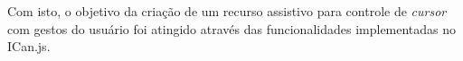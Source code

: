 
\par Com isto, o objetivo da criação de um recurso assistivo para controle de \textit{cursor} com gestos do usuário foi atingido através das funcionalidades implementadas no ICan.js.




